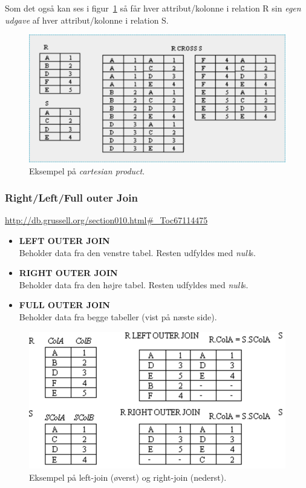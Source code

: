 Som det også kan ses i figur~\ref{fig:cartesian_product} så får hver attribut/kolonne i relation R sin \textit{egen udgave} af hver attribut/kolonne i relation S.

\begin{figure}[H]
	\centering
	\includegraphics[width=0.7\linewidth]{figs/spm6/cartesianproduct}
	\caption{Eksempel på \textit{cartesian product}.}
	\label{fig:cartesian_product}
\end{figure}

\subsubsection{Right/Left/Full outer Join}

\url{http://db.grussell.org/section010.html#_Toc67114475}\\

\begin{itemize}
	\item \textbf{LEFT OUTER JOIN}\\
	Beholder data fra den venstre tabel. Resten udfyldes med \textit{null}s.
	\item \textbf{RIGHT OUTER JOIN}\\
	Beholder data fra den højre tabel. Resten udfyldes med \textit{null}s.
	\item \textbf{FULL OUTER JOIN}\\
	Beholder data fra begge tabeller (vist på næste side).
\end{itemize}

\begin{figure}[H]
\centering
\includegraphics[width=0.6\linewidth]{figs/spm6/outerjoins}
\caption{Eksempel på left-join (øverst) og right-join (nederst).}
\label{fig:outerjoins}
\end{figure}

